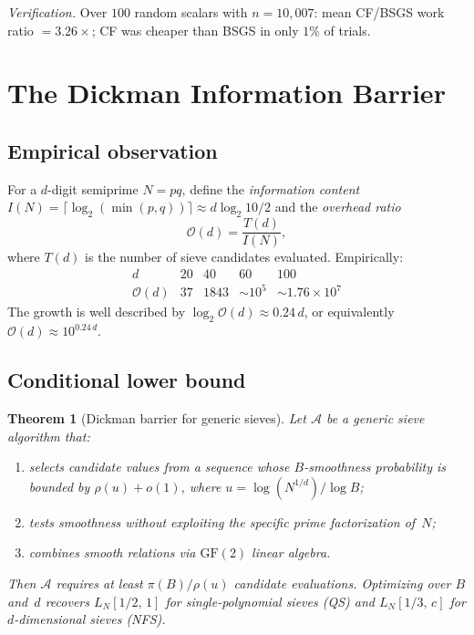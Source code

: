 \documentclass[12pt]{amsart}
\newtheorem{theorem}{Theorem}[section]
\theoremstyle{definition}
\theoremstyle{remark}
\begin{document}
\noindent
\textit{Verification.}  Over $100$ random scalars with $n=10{,}007$: mean
CF/BSGS work ratio $=3.26\times$; CF was cheaper than BSGS in only $1\%$ of
trials.


\section{The Dickman Information Barrier}\label{sec:dickman}

\subsection{Empirical observation}

For a $d$-digit semiprime $N=pq$, define the \emph{information content}
$I(N)=\lceil\log_{2}(\min(p,q))\rceil\approx d\log_{2}10/2$ and the
\emph{overhead ratio}
\[
  \mathcal{O}(d) = \frac{T(d)}{I(N)},
\]
where $T(d)$ is the number of sieve candidates evaluated.  Empirically:
\[
\begin{array}{c|cccc}
  d & 20 & 40 & 60 & 100 \\
  \hline
  \mathcal{O}(d) & 37 & 1843 & \sim10^{5} & \sim1.76\times10^{7}
\end{array}
\]
The growth is well described by $\log_{2}\mathcal{O}(d)\approx0.24\,d$, or equivalently
$\mathcal{O}(d)\approx10^{0.24\,d}$.

\subsection{Conditional lower bound}

\begin{theorem}[Dickman barrier for generic sieves]\label{thm:dickman}
Let $\mathcal{A}$ be a \emph{generic sieve algorithm} that:
\begin{enumerate}[label=(\roman*)]
  \item selects candidate values from a sequence whose $B$-smoothness
    probability is bounded by $\rho(u)+o(1)$, where $u=\log(N^{1/d})/\log B$;
  \item tests smoothness without exploiting the specific prime factorization of~$N$;
  \item combines smooth relations via $\mathrm{GF}(2)$ linear algebra.
\end{enumerate}
Then $\mathcal{A}$ requires at least $\pi(B)/\rho(u)$ candidate evaluations.
Optimizing over $B$ and~$d$ recovers $L_{N}[1/2,\,1]$ for single-polynomial
sieves (QS) and $L_{N}[1/3,\,c]$ for $d$-dimensional sieves (NFS).
\end{theorem}
\end{document}
